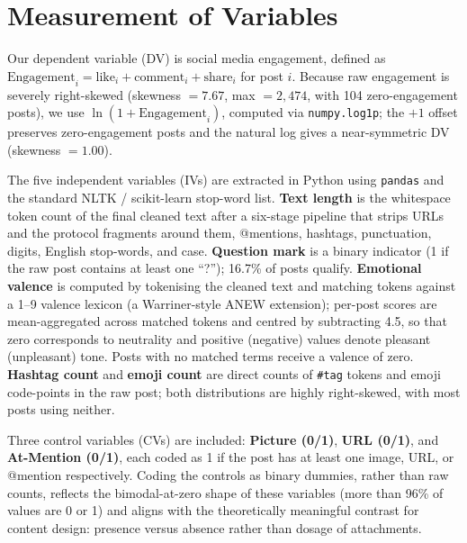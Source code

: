 \documentclass[12pt,a4paper]{article}
\begin{document}
\section{Measurement of Variables}

Our dependent variable (DV) is social media engagement, defined as $\text{Engagement}_i = \text{like}_i + \text{comment}_i + \text{share}_i$ for post $i$. Because raw engagement is severely right-skewed (skewness $=7.67$, max $=2{,}474$, with 104 zero-engagement posts), we use $\ln(1+\text{Engagement}_i)$, computed via \texttt{numpy.log1p}; the $+1$ offset preserves zero-engagement posts and the natural log gives a near-symmetric DV (skewness $=1.00$).

The five independent variables (IVs) are extracted in Python using \texttt{pandas} and the standard NLTK / scikit-learn stop-word list. \textbf{Text length} is the whitespace token count of the final cleaned text after a six-stage pipeline that strips URLs and the protocol fragments around them, @mentions, hashtags, punctuation, digits, English stop-words, and case. \textbf{Question mark} is a binary indicator (1 if the raw post contains at least one ``?''); 16.7\% of posts qualify. \textbf{Emotional valence} is computed by tokenising the cleaned text and matching tokens against a 1--9 valence lexicon (a Warriner-style ANEW extension); per-post scores are mean-aggregated across matched tokens and centred by subtracting 4.5, so that zero corresponds to neutrality and positive (negative) values denote pleasant (unpleasant) tone. Posts with no matched terms receive a valence of zero. \textbf{Hashtag count} and \textbf{emoji count} are direct counts of \texttt{\#tag} tokens and emoji code-points in the raw post; both distributions are highly right-skewed, with most posts using neither.

Three control variables (CVs) are included: \textbf{Picture (0/1)}, \textbf{URL (0/1)}, and \textbf{At-Mention (0/1)}, each coded as 1 if the post has at least one image, URL, or @mention respectively. Coding the controls as binary dummies, rather than raw counts, reflects the bimodal-at-zero shape of these variables (more than 96\% of values are 0 or 1) and aligns with the theoretically meaningful contrast for content design: presence versus absence rather than dosage of attachments.
\end{document}
